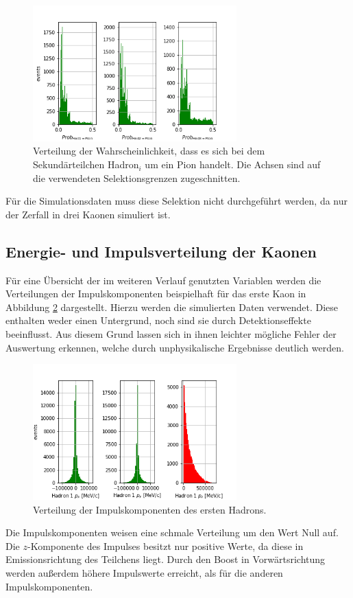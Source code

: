 \begin{figure}
  \centering
  \includegraphics[width=0.7\textwidth]{plots/sim_ProbPi_hist.png}
  \caption{Verteilung der Wahrscheinlichkeit, dass es sich bei dem Sekundärteilchen Hadron$_i$ um ein Pion handelt. Die Achsen sind auf die verwendeten Selektionsgrenzen zugeschnitten.}
  \label{fig:probPi}
\end{figure}
\FloatBarrier
Für die Simulationsdaten muss diese Selektion nicht durchgeführt werden, da nur der Zerfall in drei Kaonen simuliert ist.

\subsection{Energie- und Impulsverteilung der Kaonen}
Für eine Übersicht der im weiteren Verlauf genutzten Variablen werden die Verteilungen der Impulskomponenten beispielhaft für das erste Kaon in Abbildung \ref{fig:Impuls1} dargestellt. Hierzu werden die simulierten Daten verwendet. Diese enthalten weder einen Untergrund, noch sind sie durch Detektionseffekte beeinflusst. Aus diesem Grund lassen sich in ihnen leichter mögliche Fehler der Auswertung erkennen, welche durch unphysikalische Ergebnisse deutlich werden.
\begin{figure}
  \centering
  \includegraphics[width=0.7\textwidth]{plots/sim_pall_hist}
  \caption{Verteilung der Impulskomponenten des ersten Hadrons.}
  \label{fig:Impuls1}
\end{figure}
\FloatBarrier
Die Impulskomponenten weisen eine schmale Verteilung um den Wert Null auf.
Die $z$-Komponente des Impulses besitzt nur positive Werte, da diese in Emissionsrichtung des Teilchens liegt. Durch den Boost in Vorwärtsrichtung werden außerdem höhere Impulswerte erreicht, als für die anderen Impulskomponenten.

